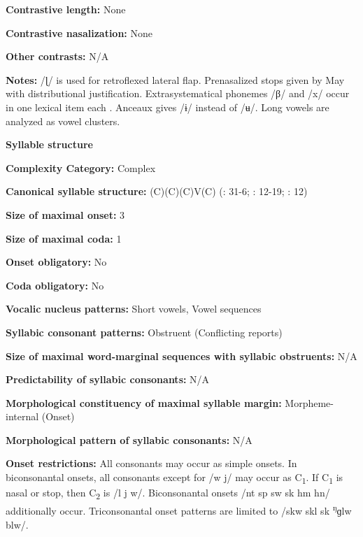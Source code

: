 \textbf{Contrastive length:} None



\textbf{Contrastive nasalization:} None



\textbf{Other contrasts:} N/A



\textbf{Notes:} /ɭ/ is used for retroflexed lateral flap. Prenasalized stops given by May with distributional justification. Extrasystematical phonemes /β/ and /x/ occur in one lexical item each \citep[9]{Anceaux1965}. Anceaux gives /ɨ/ instead of /ʉ/. Long vowels are analyzed as vowel clusters.



\textbf{Syllable structure}



\textbf{Complexity Category:} Complex



\textbf{Canonical syllable structure:} (C)(C)(C)V(C) (\citealt{Anceaux1965}: 31-6; \citealt{May1997}: 12-19; \citealt{MayMay1981}: 12)



\textbf{Size of maximal onset:} 3



\textbf{Size of maximal coda:} 1



\textbf{Onset obligatory:} No



\textbf{Coda obligatory:} No



\textbf{Vocalic nucleus patterns:} Short vowels, Vowel sequences



\textbf{Syllabic consonant patterns:} Obstruent (Conflicting reports)



\textbf{Size of maximal word{}-marginal sequences with syllabic obstruents:} N/A



\textbf{Predictability of syllabic consonants:} N/A



\textbf{Morphological constituency of maximal syllable margin:} Morpheme-internal (Onset)



\textbf{Morphological pattern of syllabic consonants:} N/A



\textbf{Onset restrictions:} All consonants may occur as simple onsets. In biconsonantal onsets, all consonants except for /w j/ may occur as C\textsubscript{1}. If C\textsubscript{1} is nasal or stop, then C\textsubscript{2} is /l j w/. Biconsonantal onsets /nt sp sw sk hm hn/ additionally occur. Triconsonantal onset patterns are limited to /skw skl sk \textsuperscript{ŋ}ɡlw blw/.



